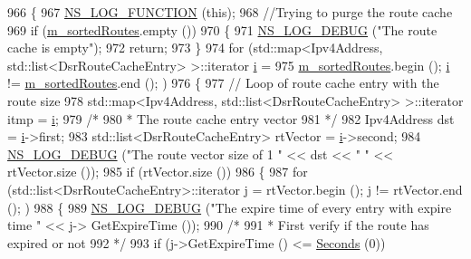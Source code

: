\begin{DoxyCode}
966 \{
967   \hyperlink{log-macros-disabled_8h_a90b90d5bad1f39cb1b64923ea94c0761}{NS\_LOG\_FUNCTION} (\textcolor{keyword}{this});
968   \textcolor{comment}{//Trying to purge the route cache}
969   \textcolor{keywordflow}{if} (\hyperlink{classns3_1_1dsr_1_1DsrRouteCache_a8d3530713c7152dbe42d0b616d9c1d96}{m\_sortedRoutes}.empty ())
970     \{
971       \hyperlink{group__logging_ga413f1886406d49f59a6a0a89b77b4d0a}{NS\_LOG\_DEBUG} (\textcolor{stringliteral}{"The route cache is empty"});
972       \textcolor{keywordflow}{return};
973     \}
974   \textcolor{keywordflow}{for} (std::map<Ipv4Address, std::list<DsrRouteCacheEntry> >::iterator \hyperlink{bernuolliDistribution_8m_a6f6ccfcf58b31cb6412107d9d5281426}{i} =
975          \hyperlink{classns3_1_1dsr_1_1DsrRouteCache_a8d3530713c7152dbe42d0b616d9c1d96}{m\_sortedRoutes}.begin (); \hyperlink{bernuolliDistribution_8m_a6f6ccfcf58b31cb6412107d9d5281426}{i} != \hyperlink{classns3_1_1dsr_1_1DsrRouteCache_a8d3530713c7152dbe42d0b616d9c1d96}{m\_sortedRoutes}.end (); )
976     \{
977       \textcolor{comment}{// Loop of route cache entry with the route size}
978       std::map<Ipv4Address, std::list<DsrRouteCacheEntry> >::iterator itmp = \hyperlink{bernuolliDistribution_8m_a6f6ccfcf58b31cb6412107d9d5281426}{i};
979       \textcolor{comment}{/*}
980 \textcolor{comment}{       * The route cache entry vector}
981 \textcolor{comment}{       */}
982       Ipv4Address dst = \hyperlink{bernuolliDistribution_8m_a6f6ccfcf58b31cb6412107d9d5281426}{i}->first;
983       std::list<DsrRouteCacheEntry> rtVector = \hyperlink{bernuolliDistribution_8m_a6f6ccfcf58b31cb6412107d9d5281426}{i}->second;
984       \hyperlink{group__logging_ga413f1886406d49f59a6a0a89b77b4d0a}{NS\_LOG\_DEBUG} (\textcolor{stringliteral}{"The route vector size of 1 "} << dst << \textcolor{stringliteral}{" "} << rtVector.size ());
985       \textcolor{keywordflow}{if} (rtVector.size ())
986         \{
987           \textcolor{keywordflow}{for} (std::list<DsrRouteCacheEntry>::iterator j = rtVector.begin (); j != rtVector.end (); )
988             \{
989               \hyperlink{group__logging_ga413f1886406d49f59a6a0a89b77b4d0a}{NS\_LOG\_DEBUG} (\textcolor{stringliteral}{"The expire time of every entry with expire time "} << j->
      GetExpireTime ());
990               \textcolor{comment}{/*}
991 \textcolor{comment}{               * First verify if the route has expired or not}
992 \textcolor{comment}{               */}
993               \textcolor{keywordflow}{if} (j->GetExpireTime () <= \hyperlink{group__timecivil_ga33c34b816f8ff6628e33d5c8e9713b9e}{Seconds} (0))

\end{DoxyCode}
